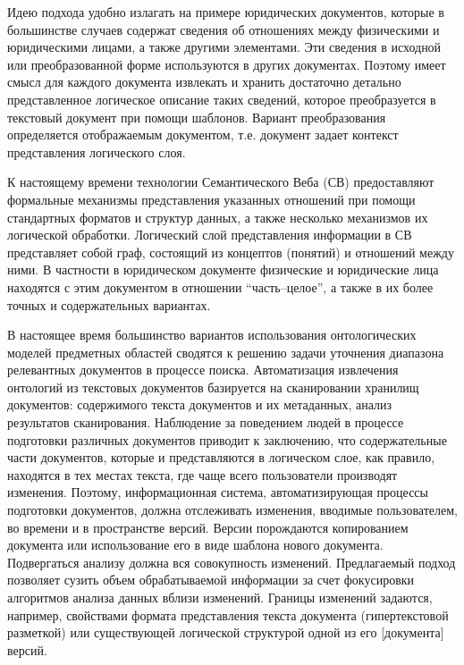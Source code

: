 \documentclass[utf8]{../IncArticle}
\newcommand{\e}[2][fcolor]{\textcolor{pcolor}{[}\textcolor{#1}{#2}\textcolor{pcolor}{]}}
\begin{document}
Идею подхода удобно излагать на примере юридических документов,
которые в большинстве случаев содержат сведения об отношениях между
физическими и юридическими лицами, а также другими элементами.  Эти
сведения в исходной или преобразованной форме используются в других
документах.  Поэтому имеет смысл для каждого документа извлекать и
хранить достаточно детально представленное логическое описание таких
сведений, которое преобразуется в текстовый документ при помощи
шаблонов.  Вариант преобразования определяется отображаемым документом,
т.е. документ задает контекст представления логического слоя.

К настоящему времени технологии Семантического Веба (СВ) предоставляют
формальные механизмы представления указанных отношений при помощи
стандартных форматов и структур данных, а также несколько механизмов
их логической обработки.  Логический слой представления информации в СВ
представляет собой граф, состоящий из концептов (понятий) и отношений
между ними.  В частности в юридическом документе физические и
юридические лица находятся с этим документом в отношении
``часть--целое'', а также в их более точных и содержательных вариантах.

В настоящее время большинство вариантов использования онтологических
моделей предметных областей сводятся к решению задачи уточнения
диапазона релевантных документов в процессе поиска.  Автоматизация
извлечения онтологий из текстовых документов базируется на
сканировании хранилищ документов: содержимого текста документов и их
метаданных, анализ результатов сканирования.  Наблюдение за поведением
людей в процессе подготовки различных документов приводит к
заключению, что содержательные части документов, которые и
представляются в логическом слое, как правило, находятся в тех местах
текста, где чаще всего пользователи производят изменения.  Поэтому,
информационная система, автоматизирующая процессы подготовки
документов, должна отслеживать изменения, вводимые пользователем, во
времени и в пространстве версий.  Версии порождаются копированием
документа или использование его в виде шаблона нового
документа.  Подвергаться анализу должна вся совокупность
изменений.  Предлагаемый подход позволяет сузить объем обрабатываемой
информации за счет фокусировки алгоритмов анализа данных вблизи
изменений.  Границы изменений задаются, например, свойствами формата
представления текста документа (гипертекстовой разметкой) или
существующей логической структурой одной из его \e{документа} версий.
\end{document}
